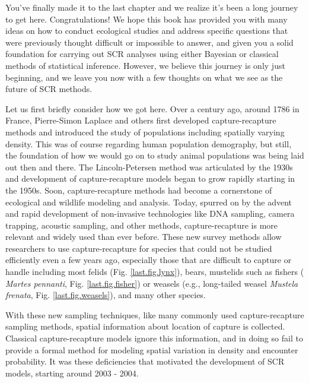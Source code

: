 You've finally made it to the last chapter and we realize it's been a
long journey to get here. Congratulations!
We hope this book has provided you with many ideas on how to conduct
ecological studies and address specific questions that were previously
thought difficult or impossible to answer, and given you a solid
foundation for carrying out SCR analyses
using either Bayesian or classical methods of statistical inference.
However, we believe this journey is only just beginning, and we leave
you now with a few thoughts on what we see as the future of SCR
methods.

Let us first briefly consider how we got here. Over a century ago,
around 1786 in France, Pierre-Simon Laplace and others first developed
capture-recapture methods and introduced the study of populations
including spatially varying density. This was of course regarding
human population demography, but still, the foundation of how we would
go on to study animal populations was being laid out then and there.
The Lincoln-Petersen method was articulated by the 1930s and
development of capture-recapture models began to grow rapidly starting
in the 1950s.  Soon, capture-recapture methods had become a
cornerstone of ecological and wildlife modeling and analysis. Today,
spurred on by the advent and rapid development of non-invasive
technologies like DNA sampling, camera trapping, acoustic sampling,
and other methods, capture-recapture is more relevant and widely used
than ever before. These new
survey methods allow researchers to use capture-recapture for species
that could not be studied efficiently even a few years ago, especially
those that are difficult to capture or handle including most felids
(Fig. \ref{last.fig.lynx}), bears, mustelids such as fishers ({\it
  Martes pennanti}, Fig. \ref{last.fig.fisher}) or weasels (e.g.,
long-tailed weasel {\it Mustela frenata},
Fig. \ref{last.fig.weasels}), and many other species.

With these new sampling techniques, like many commonly used
capture-recapture sampling methods, spatial information about location
of capture is collected.  Classical capture-recapture models ignore
this information, and in doing so fail to provide a formal method for
modeling spatial variation in density and encounter
probability. 
It was these deficiencies that motivated 
the development of SCR models, starting around
2003 - 2004.

